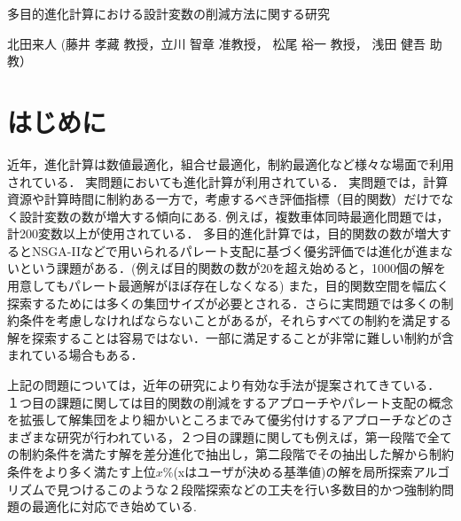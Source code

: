 \documentclass[11pt,a4j,notitlepage]{jsarticle}
\begin{document}
\begin{center}
\LARGE{多目的進化計算における設計変数の削減方法に関する研究}
\end{center}
\begin{flushright}
北田来人 (藤井 孝藏 教授，立川 智章 准教授， 松尾 裕一 教授， 浅田 健吾 助教）
\end{flushright}
\vspace{-1.75zh}
\section {はじめに}
近年，進化計算は数値最適化，組合せ最適化，制約最適化など様々な場面で利用されている．
実問題においても進化計算が利用されている．
実問題では，計算資源や計算時間に制約ある一方で，考慮するべき評価指標（目的関数）だけでなく設計変数の数が増大する傾向にある.
例えば，複数車体同時最適化問題では，計200変数以上が使用されている．
多目的進化計算では，目的関数の数が増大するとNSGA-IIなどで用いられるパレート支配に基づく優劣評価では進化が進まないという課題がある．(例えば目的関数の数が20を超え始めると，1000個の解を用意してもパレート最適解がほぼ存在しなくなる\cite{Sato1})
また，目的関数空間を幅広く探索するためには多くの集団サイズが必要とされる．さらに実問題では多くの制約条件を考慮しなければならないことがあるが，それらすべての制約を満足する解を探索することは容易ではない．一部に満足することが非常に難しい制約が含まれている場合もある．

上記の問題については，近年の研究により有効な手法が提案されてきている．
１つ目の課題に関しては目的関数の削減をするアプローチ\cite{Deb1}やパレート支配の概念を拡張して解集団をより細かいところまでみて優劣付けするアプローチ\cite{HSato}などのさまざまな研究が行われている，２つ目の課題に関しても例えば，第一段階で全ての制約条件を満たす解を差分進化で抽出し，第二段階でその抽出した解から制約条件をより多く満たす上位$x\%$(xはユーザが決める基準値)の解を局所探索アルゴリズムで見つける\cite{Yo}このような２段階探索などの工夫を行い多数目的かつ強制約問題の最適化に対応でき始めている.
\end{document}
